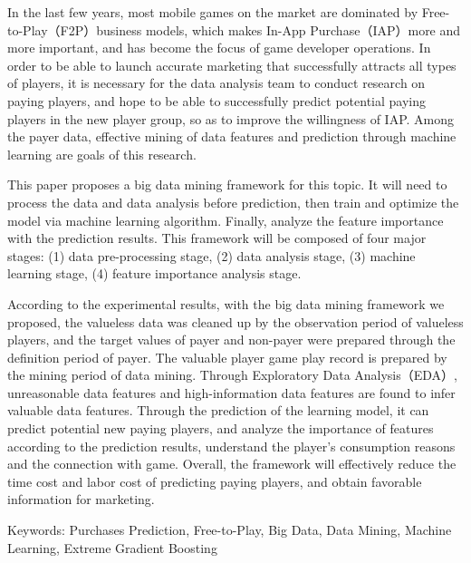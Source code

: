 In the last few years, most mobile games on the market are dominated by Free-to-Play（F2P）business models, which makes In-App Purchase（IAP）more and more important, and has become the focus of game developer operations. In order to be able to launch accurate marketing that successfully attracts all types of players, it is necessary for the data analysis team to conduct research on paying players, and hope to be able to successfully predict potential paying players in the new player group, so as to improve the willingness of IAP. Among the payer data, effective mining of data features and prediction through machine learning are goals of this research.

This paper proposes a big data mining framework for this topic. It will need to process the data and data analysis before prediction, then train and optimize the model via machine learning algorithm. Finally, analyze the feature importance with the prediction results. This framework will be composed of four major stages: (1) data pre-processing stage, (2) data analysis stage, (3) machine learning stage, (4) feature importance analysis stage.

According to the experimental results, with the big data mining framework we proposed, the valueless data was cleaned up by the observation period of valueless players, and the target values of payer and non-payer were prepared through the definition period of payer. The valuable player game play record is prepared by the mining period of data mining. Through Exploratory Data Analysis（EDA）, unreasonable data features and high-information data features are found to infer valuable data features. Through the prediction of the learning model, it can predict potential new paying players, and analyze the importance of features according to the prediction results, understand the player's consumption reasons and the connection with game. Overall, the framework will effectively reduce the time cost and labor cost of predicting paying players, and obtain favorable information for marketing.

Keywords: Purchases Prediction, Free-to-Play, Big Data, Data Mining, Machine Learning, Extreme Gradient Boosting
